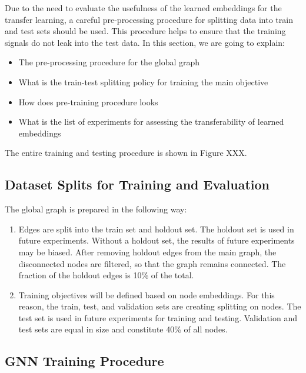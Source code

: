 \documentclass[a4paper,twoside]{article}
\begin{document}
Due to the need to evaluate the usefulness of the learned embeddings for the transfer learning, a careful pre-processing procedure for splitting data into train and test sets should be used. This procedure helps to ensure that the training signals do not leak into the test data. In this section, we are going to explain:
\begin{itemize}
    \item The pre-processing procedure for the global graph
    \item What is the train-test splitting policy for training the main objective
    \item How does pre-training procedure looks
    \item What is the list of experiments for assessing the transferability of learned embeddings
\end{itemize}

The entire training and testing procedure is shown in Figure XXX.

\subsection{Dataset Splits for Training and Evaluation}

The global graph is prepared in the following way:
\begin{enumerate}
    \item Edges are split into the train set and holdout set. The holdout set is used in future experiments. Without a holdout set, the results of future experiments may be biased. After removing holdout edges from the main graph, the disconnected nodes are filtered, so that the graph remains connected. The fraction of the holdout edges is 10\% of the total.
    \item Training objectives will be defined based on node embeddings. For this reason, the train, test, and validation sets are creating splitting on nodes. The test set is used in future experiments for training and testing. Validation and test sets are equal in size and constitute 40\% of all nodes.
\end{enumerate}

\subsection{GNN Training Procedure}
\end{document}
